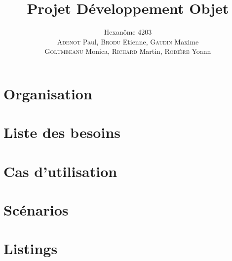 


\title{\textbf{Projet Développement Objet}}
\author{Hexanôme 4203\\
\textsc{Adenot} Paul, \textsc{Brodu} Etienne, \textsc{Gaudin} Maxime\\
\textsc{Golumbeanu} Monica, \textsc{Richard} Martin, \textsc{Rodière} Yoann}

\graphicspath{{./img/}{../img/}{../../img/}{../../../img/}}


	\maketitle
	\tableofcontents

	\newpage
	\part{Organisation}
	
	

	\newpage
	\part{Liste des besoins}
	
	

	\newpage
	\part{Cas d'utilisation}
	
	

	\newpage
	\part{Scénarios}
	
	

	\newpage
	\part{Listings}
	

